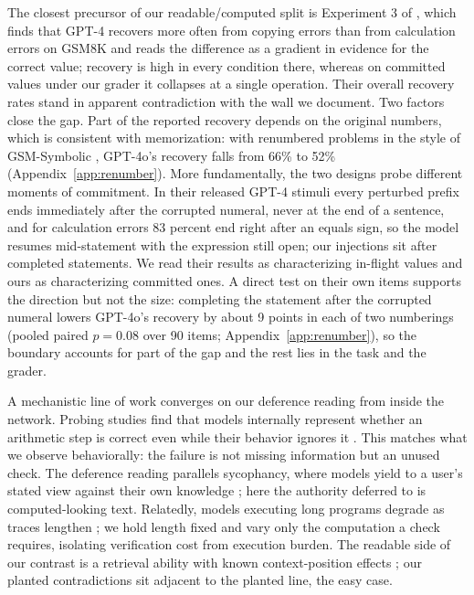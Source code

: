 The closest precursor of our readable/computed split is Experiment 3 of \citet{yee2024faithful}, which finds that GPT-4 recovers more often from copying errors than from calculation errors on GSM8K and reads the difference as a gradient in evidence for the correct value; recovery is high in every condition there, whereas on committed values under our grader it collapses at a single operation. Their overall recovery rates stand in apparent contradiction with the wall we document. Two factors close the gap. Part of the reported recovery depends on the original numbers, which is consistent with memorization: with renumbered problems in the style of GSM-Symbolic \citep{mirzadeh2025gsmsymbolic}, GPT-4o's recovery falls from 66\% to 52\% (Appendix~\ref{app:renumber}). More fundamentally, the two designs probe different moments of commitment. In their released GPT-4 stimuli every perturbed prefix ends immediately after the corrupted numeral, never at the end of a sentence, and for calculation errors 83 percent end right after an equals sign, so the model resumes mid-statement with the expression still open; our injections sit after completed statements. We read their results as characterizing in-flight values and ours as characterizing committed ones. A direct test on their own items supports the direction but not the size: completing the statement after the corrupted numeral lowers GPT-4o's recovery by about 9 points in each of two numberings (pooled paired $p=0.08$ over 90 items; Appendix~\ref{app:renumber}), so the boundary accounts for part of the gap and the rest lies in the task and the grader.

A mechanistic line of work converges on our deference reading from inside the network. Probing studies find that models internally represent whether an arithmetic step is correct even while their behavior ignores it \citep{validationgap2025}. This matches what we observe behaviorally: the failure is not missing information but an unused check. The deference reading parallels sycophancy, where models yield to a user's stated view against their own knowledge \citep{sharma2024sycophancy}; here the authority deferred to is computed-looking text. Relatedly, models executing long programs degrade as traces lengthen \citep{execdecay2026}; we hold length fixed and vary only the computation a check requires, isolating verification cost from execution burden. The readable side of our contrast is a retrieval ability with known context-position effects \citep{liu2024lost}; our planted contradictions sit adjacent to the planted line, the easy case.

